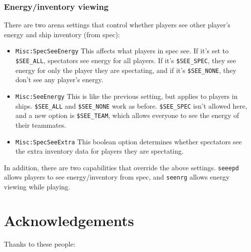 \documentclass{article}
\begin{document}
\subsubsection{Energy/inventory viewing}

There are two arena settings that control whether players see other
player's energy and ship inventory (from spec):

\begin{itemize}

\item{\texttt{Misc:SpecSeeEnergy}}
This affects what players in spec see. If it's set to \verb/$SEE_ALL/,
spectators see energy for all players. If it's \verb/$SEE_SPEC/, they
see energy for only the player they are spectating, and if it's
\verb/$SEE_NONE/, they don't see any player's energy.

\item{\texttt{Misc:SeeEnergy}}
This is like the previous setting, but applies to players in ships.
\verb/$SEE_ALL/ and \verb/$SEE_NONE/ work as before. \verb/$SEE_SPEC/
isn't allowed here, and a new option is \verb/$SEE_TEAM/, which allows
everyone to see the energy of their teammates.

\item{\texttt{Misc:SpecSeeExtra}}
This boolean option determines whether spectators see the extra
inventory data for players they are spectating.

\end{itemize}

In addition, there are two capabilities that override the above
settings. \verb/seeepd/ allows players to see energy/inventory from
spec, and \verb/seenrg/ allows energy viewing while playing.


\section{Acknowledgements}

Thanks to these people:
\end{document}
